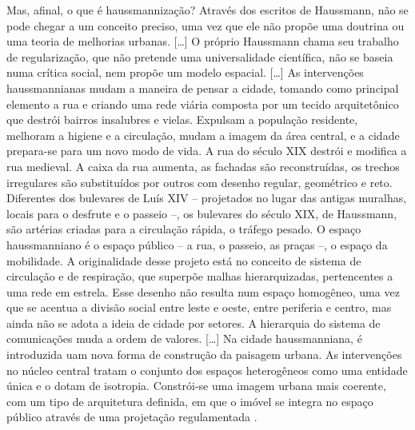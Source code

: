 \begin{citacao}
Mas, afinal, o que é haussmannização? Através dos escritos de Haussmann, não se pode chegar a um conceito preciso, uma vez que ele não propõe uma doutrina ou uma teoria de melhorias urbanas.
[\dots] O próprio Haussmann chama seu trabalho de regularização, que não pretende uma universalidade científica, não se baseia numa crítica social, nem propõe um modelo espacial.
[\dots] As intervenções haussmannianas mudam a maneira de pensar a cidade, tomando como principal elemento a rua e criando uma rede viária composta por um tecido arquitetônico que destrói bairros insalubres e vielas. Expulsam a população residente, melhoram a higiene e a circulação, mudam a imagem da área central, e a cidade prepara-se para um novo modo de vida. A rua do século XIX destrói e modifica a rua medieval. A caixa da rua aumenta, as fachadas são reconstruídas, os trechos irregulares são substituídos por outros com desenho regular, geométrico e reto. Diferentes dos bulevares de Luís XIV -- projetados no lugar das antigas muralhas, locais para o desfrute e o passeio --, os bulevares do século XIX, de Haussmann, são artérias criadas para a circulação rápida, o tráfego pesado. O espaço haussmanniano é o espaço público -- a rua, o passeio, as praças --, o espaço da mobilidade. A originalidade desse projeto está no conceito de sistema de circulação e de respiração, que superpõe malhas hierarquizadas, pertencentes a uma rede em estrela. Esse desenho não resulta num espaço homogêneo, uma vez que se acentua a divisão social entre leste e oeste, entre periferia e centro, mas ainda não se adota a ideia de cidade por setores. A hierarquia do sistema de comunicações muda a ordem de valores.
[\dots] Na cidade haussmanniana, é introduzida uam nova forma de construção da paisagem urbana. As intervenções no núcleo central tratam o conjunto dos espaços heterogêneos como uma entidade única e o dotam de isotropia. Constrói-se uma imagem urbana mais coerente, com um tipo de arquitetura definida, em que o imóvel se integra no espaço público através de uma projetação regulamentada \cite[pp.~68,~77]{petti_eurfranba_2011}.
\end{citacao}

